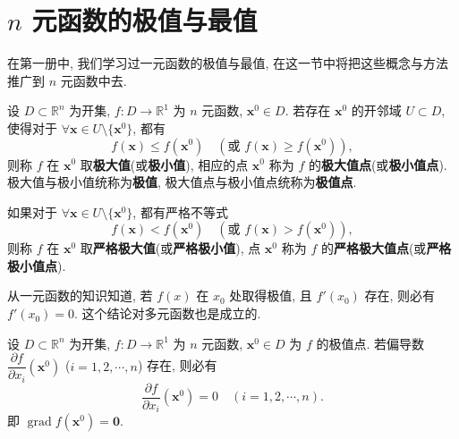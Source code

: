 \section{$n$ 元函数的极值与最值}\label{sec:9.2}

在第一册中, 我们学习过一元函数的极值与最值, 在这一节中将把这些概念与方法推广到 $n$ 元函数中去.

\begin{definition}\label{def:9.2.1}
设 $D \subset \mathbb{R}^{n}$ 为开集, $f\colon D \to \mathbb{R}^{1}$ 为 $n$ 元函数, $\boldsymbol{x}^{0} \in D$. 若存在 $\boldsymbol{x}^{0}$ 的开邻域 $U \subset D$, 使得对于 $\forall \boldsymbol{x} \in U \setminus \{\boldsymbol{x}^{0}\}$, 都有
\[
  f(\boldsymbol{x}) \leqslant f(\boldsymbol{x}^{0}) \quad (\text{或 } f(\boldsymbol{x}) \geqslant f(\boldsymbol{x}^{0})),
\]
则称 $f$ 在 $\boldsymbol{x}^{0}$ 取\textbf{极大值}(或\textbf{极小值}), 相应的点 $\boldsymbol{x}^{0}$ 称为 $f$ 的\textbf{极大值点}(或\textbf{极小值点}). 极大值与极小值统称为\textbf{极值}, 极大值点与极小值点统称为\textbf{极值点}.

如果对于 $\forall \boldsymbol{x} \in U \setminus \{\boldsymbol{x}^{0}\}$, 都有严格不等式
\[
  f(\boldsymbol{x}) < f(\boldsymbol{x}^{0}) \quad (\text{或 } f(\boldsymbol{x}) > f(\boldsymbol{x}^{0})),
\]
则称 $f$ 在 $\boldsymbol{x}^{0}$ 取\textbf{严格极大值}(或\textbf{严格极小值}), 点 $\boldsymbol{x}^{0}$ 称为 $f$ 的\textbf{严格极大值点}(或\textbf{严格极小值点}).
\end{definition}

从一元函数的知识知道, 若 $f(x)$ 在 $x_{0}$ 处取得极值, 且 $f'(x_{0})$ 存在, 则必有 $f'(x_{0}) = 0$. 这个结论对多元函数也是成立的.

\begin{theorem}[极值的必要条件]\label{thm:9.2.1}
设 $D \subset \mathbb{R}^{n}$ 为开集, $f\colon D \to \mathbb{R}^{1}$ 为 $n$ 元函数, $\boldsymbol{x}^{0} \in D$ 为 $f$ 的极值点. 若偏导数 $\dfrac{\partial f}{\partial x_{i}}(\boldsymbol{x}^{0})$ ($i = 1, 2, \cdots, n$) 存在, 则必有
\[
  \frac{\partial f}{\partial x_{i}}(\boldsymbol{x}^{0}) = 0 \quad (i = 1, 2, \cdots, n).
\]
即 $\operatorname{grad}f(\boldsymbol{x}^{0}) = \boldsymbol{0}$.
\end{theorem}

